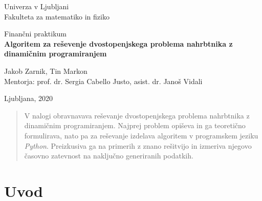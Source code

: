 \documentclass[a4paper, 11pt]{article}
\begin{document}
		\begin{titlepage}
			\begin{center}

			\large
			Univerza v Ljubljani\\
				\normalsize
				Fakulteta za matematiko in fiziko\\

			\vspace{5 cm} 

				\large
				Finančni praktikum\\


			\vspace{0.5cm}
			\LARGE
				\textbf{Algoritem za reševenje dvostopenjskega problema nahrbtnika z dinamičnim programiranjem}

			\vspace{0.5 cm}

			\large
				Jakob Zarnik, Tin Markon \\


			\vspace{1.5cm}
			\normalsize
				Mentorja: prof. dr. Sergia Cabello Justo, asist. dr. Janoš Vidali
			\vspace{3cm}


			\vfill

				\large Ljubljana, 2020

			\end{center}
		\end{titlepage}


\newpage

\tableofcontents
\vspace{22mm}

\newpage
		
	\pagestyle{fancy}
	\fancyhead{}
	\fancyfoot{}
	\fancyfoot[R]{\thepage}
	
	\begin{abstract}
	
	V nalogi obravnavava reševanje dvostopenjskega problema nahrbtnika z dinamičnim programiranjem. Najprej problem opiševa in ga teoretično formulirava, nato pa za reševanje izdelava algoritem v programskem jeziku \textit{Python}. Preizkusiva ga na primerih z znano rešitvijo in izmeriva njegovo časovno zatevnost na naključno generiranih podatkih.
	
	\end{abstract}
	
	\pagebreak
	
	\section{Uvod}
	
\end{document}
